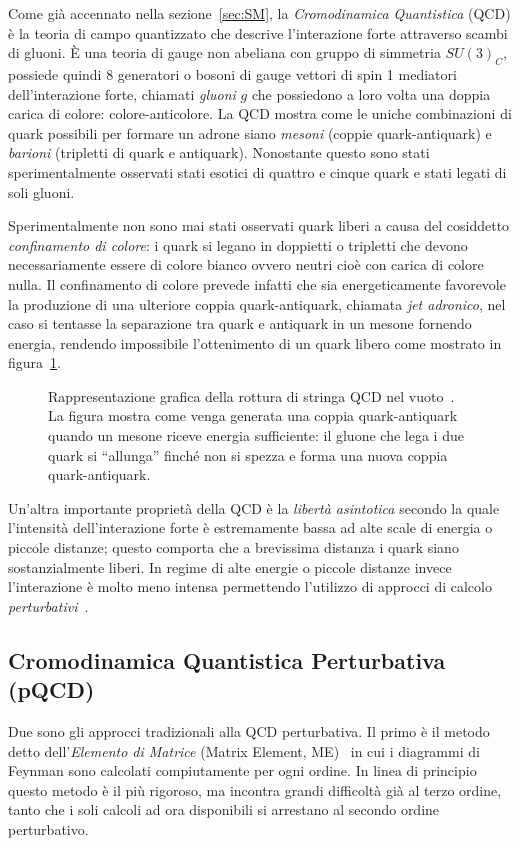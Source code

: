    Come già accennato nella sezione~\ref{sec:SM}, la \textit{Cromodinamica Quantistica} (QCD) è la teoria di campo quantizzato che descrive l'interazione forte attraverso scambi di gluoni. È una teoria di gauge non abeliana con gruppo di simmetria $SU(3)_C$, possiede quindi 8 generatori o bosoni di gauge vettori di spin 1 mediatori dell'interazione forte, chiamati \textit{gluoni} $g$ che possiedono a loro volta una doppia carica di colore: colore-anticolore. La QCD mostra come le uniche combinazioni di quark possibili per formare un adrone siano \textit{mesoni} (coppie quark-antiquark) e \textit{barioni} (tripletti di quark e antiquark). Nonostante questo sono stati sperimentalmente osservati stati esotici di quattro e cinque quark e stati legati di soli gluoni.

    Sperimentalmente non sono mai stati osservati quark liberi a causa del cosiddetto \textit{confinamento di colore}: i quark si legano in doppietti o tripletti che devono necessariamente essere di colore bianco ovvero neutri cioè con carica di colore nulla. Il confinamento di colore prevede infatti che sia energeticamente favorevole la produzione di una ulteriore coppia quark-antiquark, chiamata \textit{jet adronico}, nel caso si tentasse la separazione tra quark e antiquark in un mesone fornendo energia, rendendo impossibile l'ottenimento di un quark libero come mostrato in figura~\ref{fig:2-hadron-jet}.

    \begin{figure}[t]
        \centering
        
        \caption{Rappresentazione grafica della rottura di stringa QCD nel vuoto~\cite{Wikimedia_Quark_Confinement}. La figura mostra come venga generata una coppia quark-antiquark quando un mesone riceve energia sufficiente: il gluone che lega i due quark si ``allunga'' finché non si spezza e forma una nuova coppia quark-antiquark.}
        \label{fig:2-hadron-jet}
    \end{figure}

    Un'altra importante proprietà della QCD è la \textit{libertà asintotica} secondo la quale l'intensità dell'interazione forte è estremamente bassa ad alte scale di energia o piccole distanze; questo comporta che a brevissima distanza i quark siano sostanzialmente liberi. In regime di alte energie o piccole distanze invece l'interazione è molto meno intensa permettendo l'utilizzo di approcci di calcolo \textit{perturbativi}~\cite{BGS_2012}.

    \subsection{Cromodinamica Quantistica Perturbativa (pQCD)}
        Due sono gli approcci tradizionali alla QCD perturbativa. Il primo è il metodo detto dell'\textit{Elemento di Matrice} (Matrix Element, ME)~\cite{Vitale_1995} in cui i diagrammi di Feynman sono calcolati compiutamente per ogni ordine. In linea di principio questo metodo è il più rigoroso, ma incontra grandi difficoltà già al terzo ordine, tanto che i soli calcoli ad ora disponibili si arrestano al secondo ordine perturbativo.

